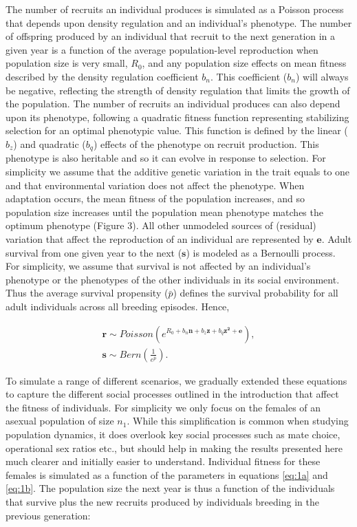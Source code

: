 \documentclass{article}
\begin{document}
The number of recruits an individual produces is simulated as a Poisson process that depends upon density regulation and an individual's phenotype. The number of offspring produced by an individual that recruit to the next generation in a given year is a function of the average population-level reproduction when population size is very small, $R_0$, and any population size effects on mean fitness described by the density regulation coefficient $b_{n}$. This coefficient ($b_{n}$) will always be negative, reflecting the strength of density regulation that limits the growth of the population. The number of recruits an individual produces can also depend upon its phenotype, following a quadratic fitness function representing stabilizing selection for an optimal phenotypic value. This function is defined by the linear ($b_z$) and quadratic ($b_q$) effects of the phenotype on recruit production. This phenotype is also heritable and so it can evolve in response to selection. For simplicity we assume that the additive genetic variation in the trait equals to one and that environmental variation does not affect the phenotype. When adaptation occurs, the mean fitness of the population increases, and so population size increases until the population mean phenotype matches the optimum phenotype (Figure 3). All other unmodeled sources of (residual) variation that affect the reproduction of an individual are represented by $\mathbf{e}$. Adult survival from one given year to the next ($\mathbf{s}$) is modeled as a Bernoulli process. For simplicity, we assume that survival is not affected by an individual's phenotype or the phenotypes of the other individuals in its social environment. Thus the average survival propensity ($\bar{p}$) defines the survival probability for all adult individuals across all breeding episodes. Hence,

\begin{subequations} 
\begin{gather}
\mathbf{r}\sim Poisson(e^{R_{0} + b_{n} \mathbf{n} + b_{z} \mathbf{z} + b_{q} \mathbf{z^2} + \mathbf{e}}), \label{eq:1a} \\
\mathbf{s}\sim Bern(\frac{1}{e^{\bar{p}}}). \label{eq:1b}
\end{gather}
\end{subequations}

To simulate a range of different scenarios, we gradually extended these equations to capture the different social processes outlined in the introduction that affect the fitness of individuals. For simplicity we only focus on the females of an asexual population of size $n_{1}$. While this simplification is common when studying population dynamics, it does overlook key social processes such as mate choice, operational sex ratios etc., but should help in making the results presented here much clearer and initially easier to understand. Individual fitness for these females is simulated as a function of the parameters in equations \ref{eq:1a} and \ref{eq:1b}. The population size the next year is thus a function of the individuals that survive plus the new recruits produced by individuals breeding in the previous generation:
\end{document}
